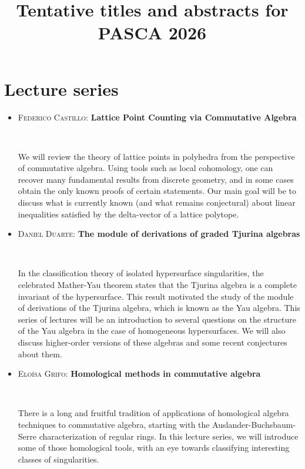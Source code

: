 \documentclass[12pt]{amsart}
\begin{document}
\title{Tentative titles and abstracts for PASCA 2026}
\maketitle

\section*{Lecture series}

\vfill


\begin{itemize}

\item \textsc{Federico Castillo:} \textbf{Lattice Point Counting via Commutative Algebra}

\

\noindent We will review the theory of lattice points in polyhedra from the perspective of commutative algebra. Using tools such as local cohomology, one can recover many fundamental results from discrete geometry, and in some cases obtain the only known proofs of certain statements. Our main goal will be to discuss what is currently known (and what remains conjectural) about linear inequalities satisfied by the delta-vector of a lattice polytope.
\vfill

\item  \textsc{Daniel Duarte:} \textbf{The module of derivations of graded Tjurina algebras}

\

\noindent In the classification theory of isolated hypersurface singularities, the celebrated Mather-Yau theorem states that the Tjurina algebra is a complete invariant of the hypersurface. This result motivated the study of the module of derivations of the Tjurina algebra, which is known as the Yau algebra. This series of lectures will be an introduction to several questions on the structure of the Yau algebra in the case of homogeneous hypersurfaces. We will also discuss higher-order versions of these algebras and some recent conjectures about them.

\vfill

\item \textsc{Elo\'isa Grifo:} \textbf{Homological methods in commutative algebra}

\

\noindent There is a long and fruitful tradition of applications of homological algebra techniques to commutative algebra, starting with the Auslander-Buchsbaum-Serre characterization of regular rings. In this lecture series, we will introduce some of those homological tools, with an eye towards classifying interesting classes of singularities.




\end{itemize}
\end{document}
